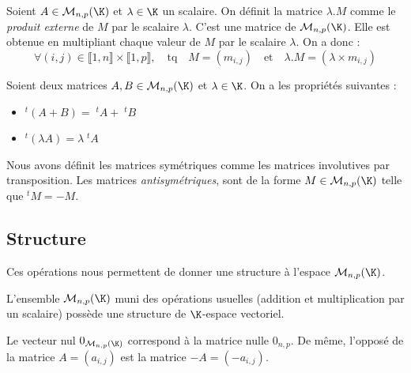 \begin{definition}
    Soient $A \in \mathcal{M}_{n,p}(\K)$ et $ \lambda \in \K$ un scalaire. 
    On définit la matrice $\lambda . M$ comme le \emph{produit externe} de $M$ par le scalaire $\lambda$. 
    C'est une matrice de $\mathcal{M}_{n,p}(\K)$. 
    Elle est obtenue en multipliant chaque valeur de $M$ par le scalaire $\lambda$. 
    On a donc : 
        \[ \forall (i,j) \in \llbracket 1, n \rrbracket \times  \llbracket 1, p \rrbracket, \quad \text{tq} \quad M = (m_{i,j}) \quad \text{et} \quad \lambda.M = (\lambda \times m_{i,j}) \] 
\end{definition}

\begin{prop}
    Soient deux matrices $A,B \in \mathcal{M}_{n,p}(\K)$ et $ \lambda \in \K$. On a les propriétés suivantes : 
    \begin{itemize}
        \item $^t(A + B) = \; ^tA + \; ^tB $
        \item $^t(\lambda A) = \lambda \; ^t A $ 
    \end{itemize}
\end{prop}

\begin{definition}
    Nous avons définit les matrices symétriques comme les matrices involutives par transposition. 
    Les matrices \emph{antisymétriques}, sont de la forme $M \in \mathcal{M}_{n,p}(\K)$ telle que $^tM = - M$. 
\end{definition}


\subsection{Structure}

Ces opérations nous permettent de donner une structure à l'espace $ \mathcal{M}_{n,p}(\K)$. 

\begin{prop}[Structure]
    L'ensemble $\mathcal{M}_{n,p}(\K)$ muni des opérations usuelles (addition et multiplication par un scalaire) 
    possède une structure de $\K$-espace vectoriel. 
    
    Le vecteur nul $0_{\mathcal{M}_{n,p}(\K)}$ correspond à la matrice nulle $0_{n,p}$. 
    De même, l'opposé de la matrice $A = (a_{i,j})$ est la matrice $-A = (-a_{i,j})$. 
\end{prop}

